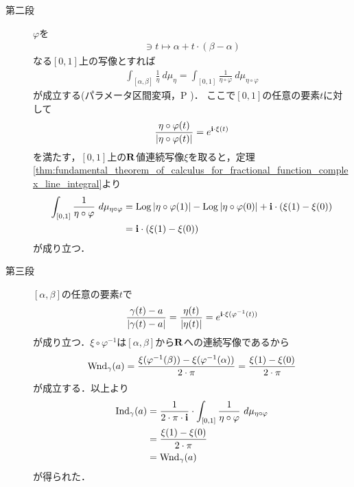 \begin{sketch}
\begin{description}
			\item[第二段]
				$\varphi$を
				\begin{align}
					[0,1] \ni t \longmapsto \alpha + t \cdot (\beta - \alpha)
				\end{align}
				なる$[0,1]$上の写像とすれば
				\begin{align}
					\int_{[\alpha,\beta]} \frac{1}{\eta}\ d\mu_{\eta}
					= \int_{[0,1]} \frac{1}{\eta \circ \varphi}\ d\mu_{\eta \circ \varphi}
				\end{align}
				が成立する(パラメータ区間変項，P \pageref{fom:change_of_parameter_interval_complex_contour_integral})．
				ここで$[0,1]$の任意の要素$t$に対して
				\begin{align}
					\frac{\eta \circ \varphi(t)}{|\eta \circ \varphi(t)|} = e^{\mathbf{i} \cdot \xi(t)}
				\end{align}
				を満たす，$[0,1]$上の$\mathbf{R}$値連続写像$\xi$を取ると，定理\ref{thm:fundamental_theorem_of_calculus_for_fractional_function_complex_line_integral}より
				\begin{align}
					\int_{[0,1]} \frac{1}{\eta \circ \varphi}\ d\mu_{\eta \circ \varphi}
					&= \pvlog{|\eta \circ \varphi(1)|} - \pvlog{|\eta \circ \varphi(0)|}
					+ \isym \cdot (\xi(1) - \xi(0)) \\
					&= \isym \cdot (\xi(1) - \xi(0))
				\end{align}
				が成り立つ．
			
			\item[第三段]
				$[\alpha,\beta]$の任意の要素$t$で
				\begin{align}
					\frac{\gamma(t)-a}{|\gamma(t) - a|}
					= \frac{\eta(t)}{|\eta(t)|}
					= e^{\mathbf{i} \cdot \xi(\varphi^{-1}(t))}
				\end{align}
				が成り立つ．$\xi \circ \varphi^{-1}$は$[\alpha,\beta]$から$\mathbf{R}$への連続写像であるから
				\begin{align}
					\operatorname{Wnd}_{\gamma}(a) = \frac{\xi(\varphi^{-1}(\beta)) - \xi(\varphi^{-1}(\alpha))}{2 \cdot \pi}
					= \frac{\xi(1) - \xi(0)}{2 \cdot \pi}
				\end{align}
				が成立する．以上より
				\begin{align}
					\operatorname{Ind}_{\gamma}(a)
					&= \frac{1}{2\cdot\pi\cdot\mathbf{i}} \cdot \int_{[0,1]} \frac{1}{\eta \circ \varphi}\ d\mu_{\eta \circ \varphi} \\
					&= \frac{\xi(1) - \xi(0)}{2 \cdot \pi} \\
					&= \operatorname{Wnd}_{\gamma}(a)
				\end{align}
				が得られた．
				\QED
		\end{description}
	\end{sketch}